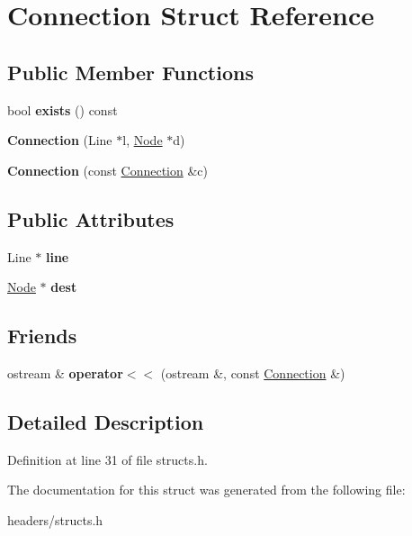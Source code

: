 \hypertarget{structConnection}{\section{Connection Struct Reference}
\label{structConnection}
}
\subsection*{Public Member Functions}
\begin{DoxyCompactItemize}
\item 
\hypertarget{structConnection_a5d69f2efa52f09b449af20c9479d67f8}{bool {\bfseries exists} () const }\label{structConnection_a5d69f2efa52f09b449af20c9479d67f8}

\item 
\hypertarget{structConnection_aaeb38386d09fdcd4d9eb70f58a31a8ed}{{\bfseries Connection} (Line $\ast$l, \hyperlink{classNode}{Node} $\ast$d)}\label{structConnection_aaeb38386d09fdcd4d9eb70f58a31a8ed}

\item 
\hypertarget{structConnection_aa865a13af12c712d04723871157205ae}{{\bfseries Connection} (const \hyperlink{structConnection}{Connection} \&c)}\label{structConnection_aa865a13af12c712d04723871157205ae}

\end{DoxyCompactItemize}
\subsection*{Public Attributes}
\begin{DoxyCompactItemize}
\item 
\hypertarget{structConnection_ac58f77f98bae33bc33702f909aa08535}{Line $\ast$ {\bfseries line}}\label{structConnection_ac58f77f98bae33bc33702f909aa08535}

\item 
\hypertarget{structConnection_a76ec6b5abe73168d8cad263d745524b3}{\hyperlink{classNode}{Node} $\ast$ {\bfseries dest}}\label{structConnection_a76ec6b5abe73168d8cad263d745524b3}

\end{DoxyCompactItemize}
\subsection*{Friends}
\begin{DoxyCompactItemize}
\item 
\hypertarget{structConnection_a43649da031123d524f6605d2b0b4ebc8}{ostream \& {\bfseries operator$<$$<$} (ostream \&, const \hyperlink{structConnection}{Connection} \&)}\label{structConnection_a43649da031123d524f6605d2b0b4ebc8}

\end{DoxyCompactItemize}


\subsection{Detailed Description}


Definition at line 31 of file structs.\+h.



The documentation for this struct was generated from the following file\+:\begin{DoxyCompactItemize}
\item 
headers/structs.\+h\end{DoxyCompactItemize}

